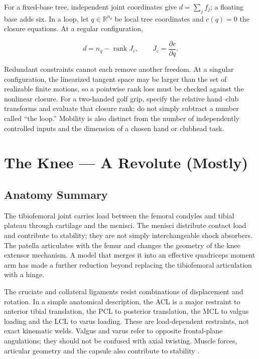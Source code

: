 For a fixed-base tree, independent joint coordinates give \(d=\sum_j f_j\); a floating base adds six. In a loop, let \(q\in\mathbb R^{n_q}\) be local tree coordinates and \(c(q)=0\) the closure equations. At a regular configuration,

\[
d=n_q-\operatorname{rank}J_c,\qquad J_c=\frac{\partial c}{\partial q}.
\]

Redundant constraints cannot each remove another freedom. At a singular configuration, the linearized tangent space may be larger than the set of realizable finite motions, so a pointwise rank loss must be checked against the nonlinear closure. For a two-handed golf grip, specify the relative hand--club transforms and evaluate that closure rank; do not simply subtract a number called ``the loop.'' Mobility is also distinct from the number of independently controlled inputs and the dimension of a chosen hand or clubhead task.


\section{The Knee --- A Revolute (Mostly)}\label{sec-knee_joint}\label{sec:knee_joint}

\subsection{Anatomy Summary}\label{anatomy-summary}

The tibiofemoral joint carries load between the femoral condyles and tibial plateau through cartilage and the menisci. The menisci distribute contact load and contribute to stability; they are not simply interchangeable shock absorbers. The patella articulates with the femur and changes the geometry of the knee extensor mechanism. A model that merges it into an effective quadriceps moment arm has made a further reduction beyond replacing the tibiofemoral articulation with a hinge.

The cruciate and collateral ligaments resist combinations of displacement and rotation. In a simple anatomical description, the ACL is a major restraint to anterior tibial translation, the PCL to posterior translation, the MCL to valgus loading and the LCL to varus loading. These are load-dependent restraints, not exact kinematic welds. Valgus and varus refer to opposite frontal-plane angulations; they should not be confused with axial twisting. Muscle forces, articular geometry and the capsule also contribute to stability \citep{Neumann2017, Nordin2012}.

